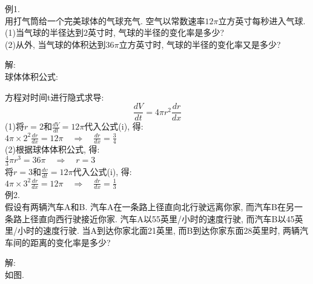 \documentclass[UTF8, fontset=ubuntu, fleqn]{ctexart}
\begin{document}
例1.\\
用打气筒给一个完美球体的气球充气. 空气以常数速率$12\pi$立方英寸每秒进入气球.\\
(1)当气球的半径达到$2$英寸时, 气球的半径的变化率是多少?\\
(2)从外, 当气球的体积达到$36\pi$立方英寸时, 气球的半径的变化率又是多少?

解:\\
球体体积公式:\\[-2ex]
\begin{center}
\end{center}
方程对时间t进行隐式求导:
\begin{equation}
\displaystyle\frac{dV}{dt}=4\pi r^2\frac{dr}{dx}
\end{equation}
(1)将$r=2$和$\frac{dV}{dt}=12\pi$代入公式(i), 得:\\[1ex]
\phantom{(1)}$\displaystyle 4\pi\times 2^2\frac{dr}{dx}=12\pi\quad\Rightarrow\quad\frac{dr}{dx}=\frac{3}{4}$\\[1ex]
(2)根据球体体积公式, 得:\\[1ex]
\phantom{(2)}$\displaystyle\frac{4}{3}\pi r^3=36\pi\quad\Rightarrow\quad r=3$\\[1ex]
\phantom{(2)}将$r=3$和$\frac{dv}{dt}=12\pi$代入公式(i), 得:\\[1ex]
\phantom{(2)}$\displaystyle 4\pi\times 3^2\frac{dr}{dx}=12\pi\quad\Rightarrow\quad\frac{dr}{dx}=\frac{1}{3}$\\[2ex]

例2.\\
假设有两辆汽车A和B. 汽车A在一条路上径直向北行驶远离你家, 而汽车B在另一条路上径直向西行驶接近你家. 汽车A以55英里/小时的速度行驶, 而汽车B以45英里/小时的速度行驶. 当A到达你家北面21英里, 而B到达你家东面28英里时, 两辆汽车间的距离的变化率是多少?

解:\\
如图.\\
\end{document}
